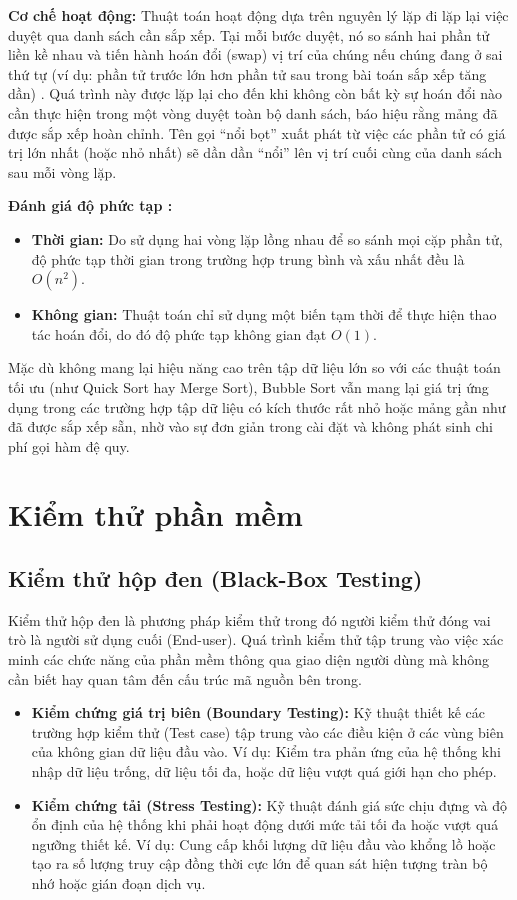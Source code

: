 \documentclass{report}
\begin{document}
\textbf{Cơ chế hoạt động:} Thuật toán hoạt động dựa trên nguyên lý lặp đi lặp lại việc duyệt qua danh sách cần sắp xếp. Tại mỗi bước duyệt, nó so sánh hai phần tử liền kề nhau và tiến hành hoán đổi (swap) vị trí của chúng nếu chúng đang ở sai thứ tự (ví dụ: phần tử trước lớn hơn phần tử sau trong bài toán sắp xếp tăng dần) \cite{nguyenducnghia2013}. Quá trình này được lặp lại cho đến khi không còn bất kỳ sự hoán đổi nào cần thực hiện trong một vòng duyệt toàn bộ danh sách, báo hiệu rằng mảng đã được sắp xếp hoàn chỉnh. Tên gọi ``nổi bọt'' xuất phát từ việc các phần tử có giá trị lớn nhất (hoặc nhỏ nhất) sẽ dần dần ``nổi'' lên vị trí cuối cùng của danh sách sau mỗi vòng lặp.

\textbf{Đánh giá độ phức tạp \cite{nguyenducnghia2013}:}
\begin{itemize}
    \item \textbf{Thời gian:} Do sử dụng hai vòng lặp lồng nhau để so sánh mọi cặp phần tử, độ phức tạp thời gian trong trường hợp trung bình và xấu nhất đều là $O(n^2)$.
    \item \textbf{Không gian:} Thuật toán chỉ sử dụng một biến tạm thời để thực hiện thao tác hoán đổi, do đó độ phức tạp không gian đạt $O(1)$.
\end{itemize}

Mặc dù không mang lại hiệu năng cao trên tập dữ liệu lớn so với các thuật toán tối ưu (như Quick Sort hay Merge Sort), Bubble Sort vẫn mang lại giá trị ứng dụng trong các trường hợp tập dữ liệu có kích thước rất nhỏ hoặc mảng gần như đã được sắp xếp sẵn, nhờ vào sự đơn giản trong cài đặt và không phát sinh chi phí gọi hàm đệ quy.

\section{Kiểm thử phần mềm}

\subsection{Kiểm thử hộp đen (Black-Box Testing)}

Kiểm thử hộp đen là phương pháp kiểm thử trong đó người kiểm thử đóng vai trò là người sử dụng cuối (End-user). Quá trình kiểm thử tập trung vào việc xác minh các chức năng của phần mềm thông qua giao diện người dùng mà không cần biết hay quan tâm đến cấu trúc mã nguồn bên trong.
\begin{itemize}
    \item \textbf{Kiểm chứng giá trị biên (Boundary Testing):} Kỹ thuật thiết kế các trường hợp kiểm thử (Test case) tập trung vào các điều kiện ở các vùng biên của không gian dữ liệu đầu vào. Ví dụ: Kiểm tra phản ứng của hệ thống khi nhập dữ liệu trống, dữ liệu tối đa, hoặc dữ liệu vượt quá giới hạn cho phép.
    \item \textbf{Kiểm chứng tải (Stress Testing):} Kỹ thuật đánh giá sức chịu đựng và độ ổn định của hệ thống khi phải hoạt động dưới mức tải tối đa hoặc vượt quá ngưỡng thiết kế. Ví dụ: Cung cấp khối lượng dữ liệu đầu vào khổng lồ hoặc tạo ra số lượng truy cập đồng thời cực lớn để quan sát hiện tượng tràn bộ nhớ hoặc gián đoạn dịch vụ.
\end{itemize}
\end{document}
